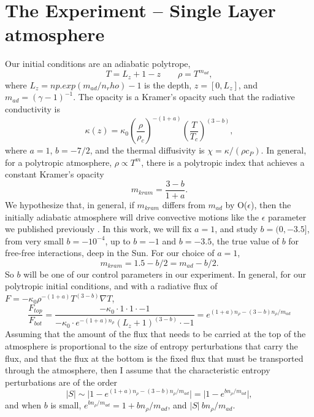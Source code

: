 \documentclass[aps, pre, onecolumn, nofootinbib, notitlepage, groupedaddress, amsfonts, amssymb, amsmath, longbibliography]{revtex4-1}
\newcommand{\grad}{\ensuremath{\nabla}}
\begin{document}
\section{The Experiment -- Single Layer atmosphere}
Our initial conditions are an adiabatic polytrope,
$$
T = L_z + 1 - z \qquad \rho = T^{m_{ad}},
$$
where $L_z = np.exp(m_{ad}/n_rho) - 1$ is the depth, $z = [0, L_z]$, and
$m_{ad} = (\gamma - 1)^{-1}$.
The opacity is a Kramer's opacity \cite{kapyla&all2017} such that the
radiative conductivity is
$$
\kappa(z) = \kappa_0 \left(\frac{\rho}{\rho_c}\right)^{-(1+a)} \left(\frac{T}{T_c}\right)^{(3-b)},
$$
where $a = 1$, $b = -7/2$, and the thermal diffusivity is 
$\chi = \kappa / (\rho c_P)$. In general, for a polytropic
atmosphere, $\rho \propto T^m$, there is a polytropic index
that achieves a constant Kramer's opacity \cite{jones1976}
$$
m_{kram} = \frac{3 - b}{1 + a}.
$$
We hypothesize that, in general, if $m_{kram}$ differs from
$m_{ad}$ by O($\epsilon$), then the initially adiabatic atmosphere will
drive convective motions like the $\epsilon$ parameter we published
previously \cite{anders&brown2017}. In this work, we will fix
$a = 1$, and study $b = (0, -3.5]$, from very small $b = -10^{-4}$,
up to $b = -1$ and $b = -3.5$, the true value of $b$ for free-free
interactions, deep in the Sun. For our choice of $a = 1$,
\begin{equation}
m_{kram} = 1.5 - b/2 = m_{ad} - b/2.
\end{equation}
So $b$ will be one of our control parameters in our experiment. In
general, for our polytropic initial conditions, and with a radiative
flux of $F = -\kappa_0 \rho^{-(1+a)}T^{(3-b)} \grad T$,
\begin{equation}
\frac{F_{top}}{F_{bot}} = \frac{-\kappa_0\cdot 1 \cdot 1 \cdot -1}
                         {-\kappa_0\cdot e^{-(1+a)n_\rho} (L_z+1)^{(3-b)}\cdot -1}
= e^{(1+a)n_\rho - (3-b)n_\rho / m_{ad}}
\end{equation}
Assuming that the amount of the flux that needs to be carried at the top of
the atmosphere is proportional to the size of entropy perturbations that
carry the flux, and that the flux at the
bottom is the fixed flux that must be transported through the atmosphere, 
then I assume that the characteristic entropy perturbations are of the order
$$
|S| \sim \bigg| 1 - e^{(1+a)n_\rho - (3-b)n_\rho / m_{ad}} \bigg| = \bigg| 1 - e^{b n_\rho / m_{ad}} \bigg|,
$$
and when $b$ is small, $e^{b n_\rho / m_{ad}} = 1 + b n_\rho / m_{ad}$, and
$|S| ~ b n_\rho / m_{ad}$.
\end{document}
